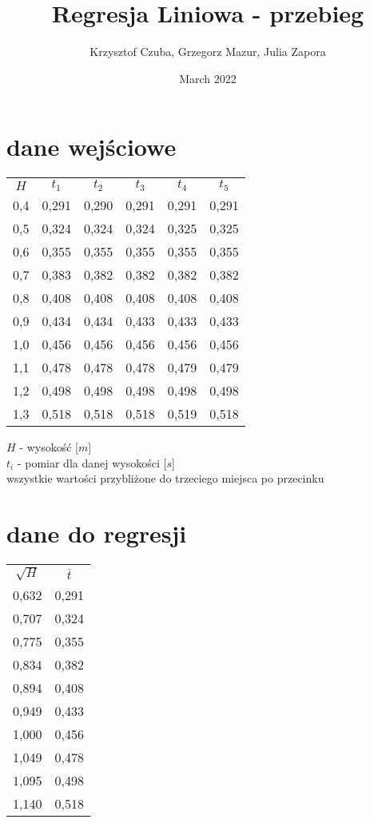 \documentclass{article}
\title{Regresja Liniowa - przebieg}
\author{Krzysztof Czuba, Grzegorz Mazur, Julia Zapora}
\date{March 2022}
\begin{document}
\maketitle
\section{dane wejściowe}

\begin{center}\large{
\begin{tabular}{ c c c c c c }
    $H$ & $t_{1}$ & $t_{2}$ & $t_{3}$ & $t_{4}$ & $t_{5}$ \\
	0,4 & 0,291 & 0,290 & 0,291 & 0,291 & 0,291 \\
	0,5 & 0,324 & 0,324 & 0,324 & 0,325 & 0,325 \\
	0,6 & 0,355 & 0,355 & 0,355 & 0,355 & 0,355 \\
	0,7 & 0,383 & 0,382 & 0,382 & 0,382 & 0,382 \\
	0,8 & 0,408 & 0,408 & 0,408 & 0,408 & 0,408 \\
	0,9 & 0,434 & 0,434 & 0,433 & 0,433 & 0,433 \\
	1,0 & 0,456 & 0,456 & 0,456 & 0,456 & 0,456 \\
    1,1 & 0,478 & 0,478 & 0,478 & 0,479 & 0,479 \\
	1,2 & 0,498 & 0,498 & 0,498 & 0,498 & 0,498 \\
	1,3 & 0,518 & 0,518 & 0,518 & 0,519 & 0,518 
\end{tabular}
}\end{center}

\begin{center}\large{
    $H$ - wysokość [$m$] \\
    $t_{i}$ - pomiar dla danej wysokości [$s$] \\
    wszystkie wartości przybliżone do trzeciego miejsca po przecinku
}\end{center}

\newpage
\section{dane do regresji}
\begin{center}\large{
\begin{tabular}{ c c }
    $\sqrt{H}$ & $\bar{t}$\\
	0,632 & 0,291 \\
	0,707 & 0,324 \\
	0,775 & 0,355 \\
	0,834 & 0,382 \\
	0,894 & 0,408 \\
	0,949 & 0,433 \\
	1,000 & 0,456 \\
    1,049 & 0,478 \\
	1,095 & 0,498 \\
	1,140 & 0,518
\end{tabular}}
\end{center}
\end{document}
